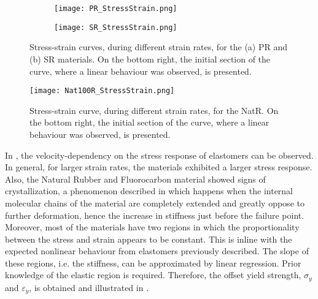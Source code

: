 \newpage
\begin{figure}[H]
    \centering
    \begin{subfigure}[b]{0.93\textwidth}
    \centering
    \texttt{[image: PR\_StressStrain.png]}
    \caption{}
    \label{fig:PRSS}
    \end{subfigure}

    \begin{subfigure}[b]{0.93\textwidth}
    \centering
    \texttt{[image: SR\_StressStrain.png]}
    \caption{}
    \label{fig:SRSS}
    \end{subfigure}
    \caption{Stress-strain curves, during different strain rates, for the (a) PR and (b) SR materials. On the bottom right, the initial section of the curve, where a linear behaviour was observed, is presented.}
    \label{fig:PR-SRSS}
\end{figure}
\newpage
\begin{figure}[H]
    \vspace*{-2em}
    \centering
    \texttt{[image: Nat100R\_StressStrain.png]}
    \caption{Stress-strain curve, during different strain rates, for the NatR. On the bottom right, the initial section of the curve, where a linear behaviour was observed, is presented.}
    \label{fig:Nat100RSS}
\end{figure}
\vspace*{-1em}
In , the velocity-dependency on the stress response of elastomers can be observed. In general, for larger strain rates, the materials exhibited a larger stress response. Also, the Natural Rubber and Fluorocarbon material showed signs of crystallization, a phenomenon described in \cite{Bauman2008} which happens when the internal molecular chains of the material are completely extended and greatly oppose to further deformation, hence the increase in stiffness just before the failure point. Moreover, most of the materials have two regions in which the proportionality between the stress and strain appears to be constant. This is inline with the expected nonlinear behaviour from elastomers previously described. The slope of these regions, i.e. the stiffness, can be approximated by linear regression. Prior knowledge of the elastic region is required. Therefore, the offset yield strength, $\sigma_y$ and $\varepsilon_y$, is obtained and illustrated in .

